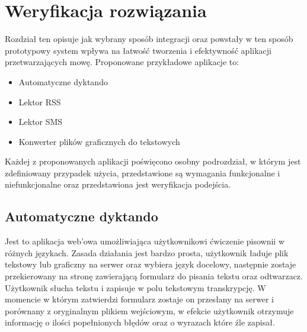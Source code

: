
\chapter{Weryfikacja rozwiązania} %



\ifpdf
    \graphicspath{{4/figures/PNG/}{4/figures/PDF/}{4/figures/}}
\else
    \graphicspath{{4/figures/EPS/}{4/figures/}}
\fi


Rozdział ten opisuje jak wybrany sposób integracji oraz powstały w ten sposób prototypowy system wpływa na łatwość tworzenia i efektywność aplikacji przetwarzających mowę. Proponowane przykładowe aplikacje to:
\begin{itemize}
	\item Automatyczne dyktando
	\item Lektor RSS
	\item Lektor SMS
	\item Konwerter plików graficznych do tekstowych
\end{itemize}
Każdej z proponowanych aplikacji poświęcono osobny podrozdział, w którym jest zdefiniowany przypadek użycia, przedstawione są wymagania funkcjonalne i niefunkcjonalne oraz przedstawiona jest weryfikacja podejścia.


\section{Automatyczne dyktando}
Jest to aplikacja web'owa umożliwiająca użytkownikowi ćwiczenie pisownii w różnych językach. Zasada działania jest bardzo prosta, użytkownik ładuje plik tekstowy lub graficzny na serwer oraz wybiera język docelowy, następnie zostaje przekierowany na stronę zawierającą formularz do pisania tekstu oraz odtwarzacz. Użytkownik słucha tekstu i zapisuje w polu tekstowym transkrypcję. W momencie w którym zatwierdzi formularz zostaje on przesłany na serwer i porównany z oryginalnym plikiem wejściowym, w efekcie użytkownik otrzymuje informację o ilości popełnionych błędów oraz o wyrazach które źle zapisał. 
\newpage
